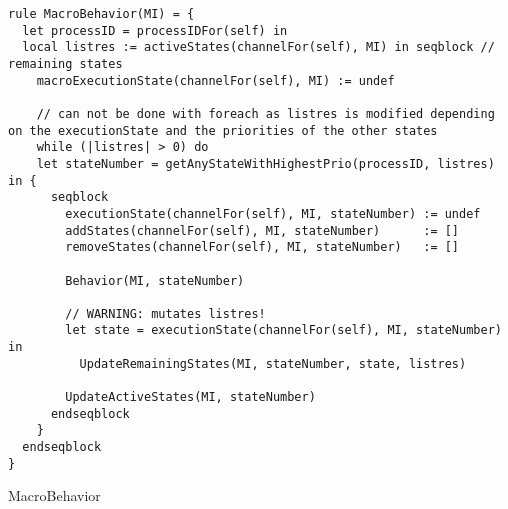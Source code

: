\begin{listing}[H]
\begin{verbatim}
rule MacroBehavior(MI) = {
  let processID = processIDFor(self) in
  local listres := activeStates(channelFor(self), MI) in seqblock // remaining states
    macroExecutionState(channelFor(self), MI) := undef

    // can not be done with foreach as listres is modified depending on the executionState and the priorities of the other states
    while (|listres| > 0) do
    let stateNumber = getAnyStateWithHighestPrio(processID, listres) in {
      seqblock
        executionState(channelFor(self), MI, stateNumber) := undef
        addStates(channelFor(self), MI, stateNumber)      := []
        removeStates(channelFor(self), MI, stateNumber)   := []

        Behavior(MI, stateNumber)

        // WARNING: mutates listres!
        let state = executionState(channelFor(self), MI, stateNumber) in
          UpdateRemainingStates(MI, stateNumber, state, listres)

        UpdateActiveStates(MI, stateNumber)
      endseqblock
    }
  endseqblock
}
\end{verbatim}
\caption{MacroBehavior}
\label{lst:asm:MacroBehavior}
\end{listing}




